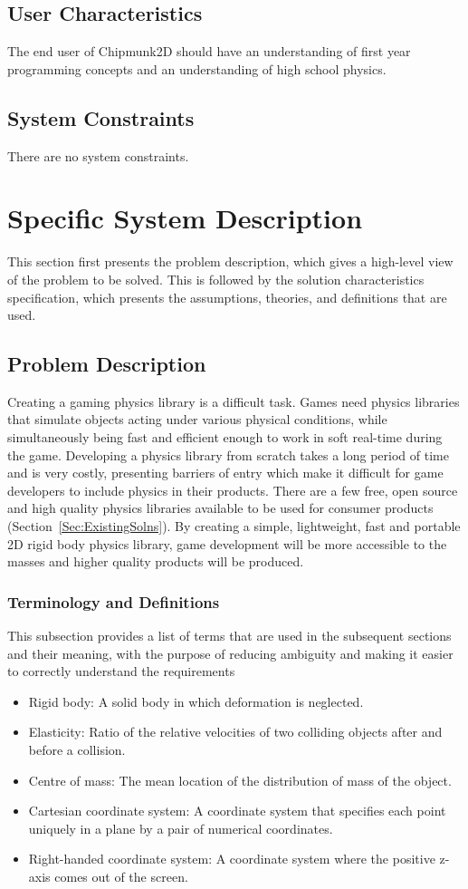 \documentclass[12pt]{article}
\begin{document}
\subsection{User Characteristics}
\label{Sec:UserChars}
The end user of Chipmunk2D should have an understanding of first year programming concepts and an understanding of high school physics.
\subsection{System Constraints}
\label{Sec:SysConstraints}
There are no system constraints.
\section{Specific System Description}
\label{Sec:SpecSystDesc}
This section first presents the problem description, which gives a high-level view of the problem to be solved. This is followed by the solution characteristics specification, which presents the assumptions, theories, and definitions that are used.
\subsection{Problem Description}
\label{Sec:ProbDesc}
Creating a gaming physics library is a difficult task. Games need physics libraries that simulate objects acting under various physical conditions, while simultaneously being fast and efficient enough to work in soft real-time during the game. Developing a physics library from scratch takes a long period of time and is very costly, presenting barriers of entry which make it difficult for game developers to include physics in their products. There are a few free, open source and high quality physics libraries available to be used for consumer products (Section~\ref{Sec:ExistingSolns}). By creating a simple, lightweight, fast and portable 2D rigid body physics library, game development will be more accessible to the masses and higher quality products will be produced.
\subsubsection{Terminology and Definitions}
\label{Sec:TermDefs}
This subsection provides a list of terms that are used in the subsequent sections and their meaning, with the purpose of reducing ambiguity and making it easier to correctly understand the requirements
\begin{itemize}
\item{Rigid body: A solid body in which deformation is neglected.}
\item{Elasticity: Ratio of the relative velocities of two colliding objects after and before a collision.}
\item{Centre of mass: The mean location of the distribution of mass of the object.}
\item{Cartesian coordinate system: A coordinate system that specifies each point uniquely in a plane by a pair of numerical coordinates.}
\item{Right-handed coordinate system: A coordinate system where the positive z-axis comes out of the screen.}
\end{itemize}
\end{document}
